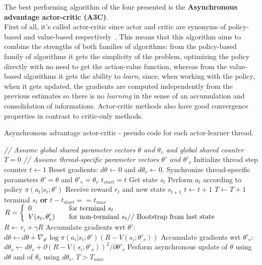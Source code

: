 The best performing algorithm of the four presented is the \textbf{Asynchronous advantage actor-critic (A3C)}. \\
First of all, it's called actor-critic since actor and critic are synonyms of policy-based and value-based respectively~\cite{konda2003}. This means that this algorithm aims to combine the strengths of both families of algorithms: from the policy-based family of algorithms it gets the simplicity of the problem, optimizing the policy directly with no need to get the action-value function, whereas from the value-based algorithms it gets the ability to \textit{learn}, since, when working with the policy, when it gets updated, the gradients are computed independently from the previous estimates so there is no \textit{learning} in the sense of an accumulation and consolidation of informations. Actor-critic methods also have good convergence properties in contrast to critic-only methods.
\begin{spacing}{1.15}
\begin{algorithm}[ht]
\caption{Asynchronous advantage actor-critic - pseudo code for each actor-learner thread.}
\begin{algorithmic}
\small
\State \emph{// Assume global shared parameter vectors $\theta$ and $\theta_v$ and global shared counter $T=0$}
\State \emph{// Assume thread-specific parameter vectors $\theta'$ and $\theta'_v$}
\State Initialize thread step counter $t\gets 1$
\Repeat
\State Reset gradients: $d\theta \gets 0$ and $d\theta_v \gets 0$.
\State Synchronize thread-specific parameters  $\theta'=\theta$ and $\theta'_v=\theta_v$ %
\State $t_{start} = t$
\State Get state $s_t$
\Repeat
\State Perform $a_t$ according to policy $\pi (a_t|s_t;\theta')$
\State Receive reward $r_t$ and new state $s_{t+1}$
%
\State $t \gets t + 1$
\State $T \gets T + 1$
\Until terminal $s_t$ \textbf{or} $t-t_{start}==t_{max}$
\State $R =
    \left\{
    \begin{array}{l l}
      0  \quad & \text{for terminal } s_t\\
        V(s_t,\theta'_v) \quad & \text{for non-terminal } s_t \text{// Bootstrap from last state}
    \end{array}\right.$
\State $R \gets r_i + \gamma R$
\State Accumulate gradients wrt $\theta'$: $d\theta \gets d\theta + \nabla_{\theta'} \log\pi(a_i|s_i;\theta') (R - V(s_i;\theta'_v))$
\State Accumulate gradients wrt $\theta'_v$: $d\theta_v \gets d\theta_v + {\partial\left(R - V(s_i;\theta'_v)\right)^2}/{\partial \theta'_v}$
\EndFor
%
\State Perform asynchronous update of $\theta$ using $d\theta$ and of $\theta_v$ using $d\theta_v$.
%
\Until $T > T_{max}$
\end{algorithmic}
\label{a3c-alg}
\end{algorithm}
\end{spacing}

